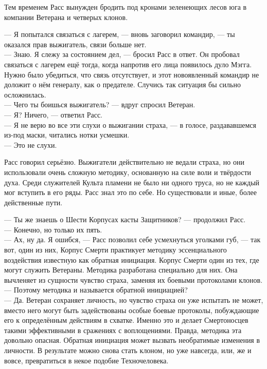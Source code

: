 Тем временем Расс вынужден бродить под кронами зеленеющих лесов юга в компании 
Ветерана и четверых клонов. 

\noindent --- Я попытался связаться с лагерем, --- вновь заговорил командир, 
--- ты оказался прав выжигатель, связи больше нет.\\
--- Знаю. Я слежу за состоянием дел, --- бросил Расс в ответ. Он пробовал 
связаться с лагерем ещё тогда, когда напротив его лица появилось дуло Мэгга. 
Нужно было убедиться, что связь отсутствует, и этот новоявленный командир не 
доложит о нём генералу, как о предателе. Случись так ситуация бы сильно 
осложнилась.\\
--- Чего ты боишься выжигатель? --- вдруг спросил Ветеран.\\
--- Я? Ничего, --- ответил Расс.\\
--- Я не верю во все эти слухи о выжигании страха, --- в голосе, раздававшемся 
из-под маски, читались нотки усмешки.\\
--- Это не слухи.

Расс говорил серьёзно. Выжигатели действительно не ведали страха, но они 
использовали очень сложную методику, основанную на силе воли и твёрдости духа. 
Среди служителей Культа пламени не было ни одного труса, но не каждый мог 
вступить в его ряды. Расс знал это по себе. Но существовали и иные, более 
действенные пути.

\noindent --- Ты же знаешь о Шести Корпусах касты Защитников? --- продолжил 
Расс.\\
--- Конечно, но только их пять.\\
--- Ах, ну да. Я ошибся, --- Расс позволил себе усмехнуться уголками губ, --- 
так вот, один из них, Корпус Смерти практикует методику эссенциального 
воздействия известную как обратная инициация. Корпус Смерти один из тех, где 
могут служить Ветераны. Методика разработана специально для них. Она вычленяет 
из сущности чувство страха, заменяя их боевыми протоколами клонов.\\
--- Поэтому методика и называется обратной инициацией?\\
--- Да. Ветеран сохраняет личность, но чувство страха он уже испытать не может, 
вместо него могут быть задействованы особые боевые протоколы, побуждающие его к 
определённым действиям в схватке. Именно это и делает Смертоносцев такими 
эффективными в сражениях с воплощениями. Правда, методика эта довольно опасная. 
Обратная инициация может вызвать необратимые изменения в личности. В результате 
можно снова стать клоном, но уже навсегда, или, же и вовсе, превратиться в некое 
подобие Техночеловека. 

